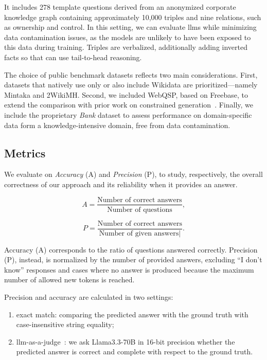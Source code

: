 %
It includes 278 template questions derived from an anonymized corporate knowledge graph containing approximately 10,000 triples and nine relations, such as ownership and control.
In this setting, we can evaluate \acp{llm} while minimizing data contamination issues, as the models are unlikely to have been exposed to this data during training. 
% 
Triples are verbalized, additionally adding inverted facts so that  can use tail-to-head reasoning.
%

%
The choice of public benchmark datasets reflects two main considerations. First, datasets that natively use only or also include Wikidata are prioritized---namely Mintaka and 2WikiMH. Second, we included WebQSP, based on Freebase, to extend the comparison with prior work on constrained generation~\cite{li-etal-2025-decoding-graphs,luo2024graphconstrainedreasoningfaithfulreasoning}. Finally, we include the proprietary \textit{Bank} dataset to assess performance on domain-specific data form a knowledge-intensive domain, free from data contamination.


\subsection{Metrics}
\label{sec:refactx:metrics}
%
We evaluate on \textit{Accuracy} (A) and \textit{Precision} (P), to study, respectively, the overall correctness of our approach and its reliability when it provides an answer.

\begin{equation}
    A = \frac{\text{Number of correct answers}}{\text{Number of questions}},
\end{equation}

\begin{equation}
    P = \frac{\text{Number of correct answers}}{\text{Number of given answers}|}.
\end{equation}

Accuracy (A) corresponds to the ratio of questions answered correctly. Precision (P), instead, is normalized by the number of provided answers, excluding ``I don't know'' responses and cases where no answer is produced because the maximum number of allowed new tokens is reached.

Precision and accuracy are calculated in two settings: 
\begin{enumerate}
    \item exact match: comparing the predicted answer with the ground truth with case-insensitive string equality;
    \item \ac{llm}-as-a-judge~\cite{zheng2023llmjudge}: we ask Llama3.3-70B in 16-bit precision whether the predicted answer is correct and complete with respect to the ground truth.
\end{enumerate}





